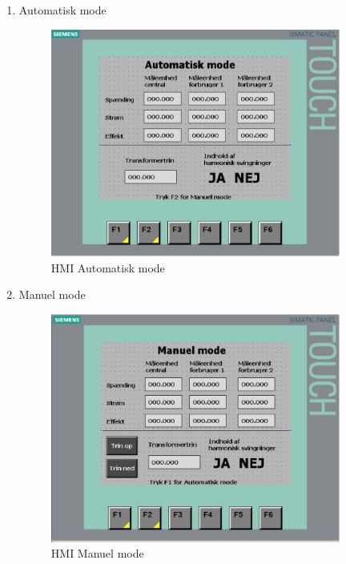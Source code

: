 \begin{enumerate}
	\item Automatisk mode
	\begin{figure}[htbp] %
		\centering
		\includegraphics[width=0.9\textwidth]{Figure/HMIAutomatiskMode}
		\caption{HMI Automatisk mode}
		\label{fig:HMIAutomatikMode}
	\end{figure}




\newpage




	\item Manuel mode
	\begin{figure}[htbp] %
	\centering
	\includegraphics[width=0.9\textwidth]{Figure/HMIManuelMode}
	\caption{HMI Manuel mode}
	\label{fig:HMIManuelMode}
	\end{figure}
\end{enumerate}




